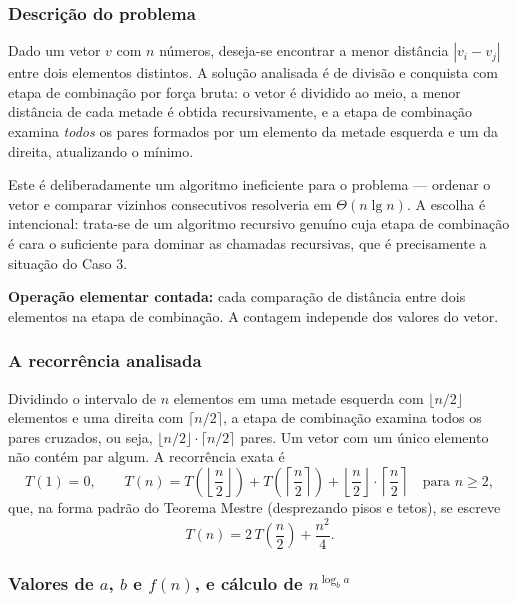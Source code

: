 \documentclass[11pt,a4paper]{article}
\begin{document}
\subsubsection{Descrição do problema}

Dado um vetor $v$ com $n$ números, deseja-se encontrar a menor distância $|v_i-v_j|$ entre dois elementos distintos. A solução analisada é de divisão e conquista com etapa de combinação por força bruta: o vetor é dividido ao meio, a menor distância de cada metade é obtida recursivamente, e a etapa de combinação examina \emph{todos} os pares formados por um elemento da metade esquerda e um da direita, atualizando o mínimo.

Este é deliberadamente um algoritmo ineficiente para o problema --- ordenar o vetor e comparar vizinhos consecutivos resolveria em $\Theta(n\lg n)$. A escolha é intencional: trata-se de um algoritmo recursivo genuíno cuja etapa de combinação é cara o suficiente para dominar as chamadas recursivas, que é precisamente a situação do Caso 3.

\textbf{Operação elementar contada:} cada comparação de distância entre dois elementos na etapa de combinação. A contagem independe dos valores do vetor.

\subsubsection{A recorrência analisada}

Dividindo o intervalo de $n$ elementos em uma metade esquerda com $\lfloor n/2\rfloor$ elementos e uma direita com $\lceil n/2\rceil$, a etapa de combinação examina todos os pares cruzados, ou seja, $\lfloor n/2\rfloor\cdot\lceil n/2\rceil$ pares. Um vetor com um único elemento não contém par algum. A recorrência exata é
\begin{equation}
T(1)=0,\qquad T(n)=T\!\left(\left\lfloor\frac n2\right\rfloor\right)+T\!\left(\left\lceil\frac n2\right\rceil\right)+\left\lfloor\frac n2\right\rfloor\cdot\left\lceil\frac n2\right\rceil\quad\text{para }n\ge2,
\label{eq:rec3}
\end{equation}
que, na forma padrão do Teorema Mestre (desprezando pisos e tetos), se escreve
\begin{equation}
T(n)=2\,T\!\left(\frac n2\right)+\frac{n^2}{4}.
\label{eq:rec3b}
\end{equation}

\subsubsection{Valores de $a$, $b$ e $f(n)$, e cálculo de $n^{\log_b a}$}
\end{document}

